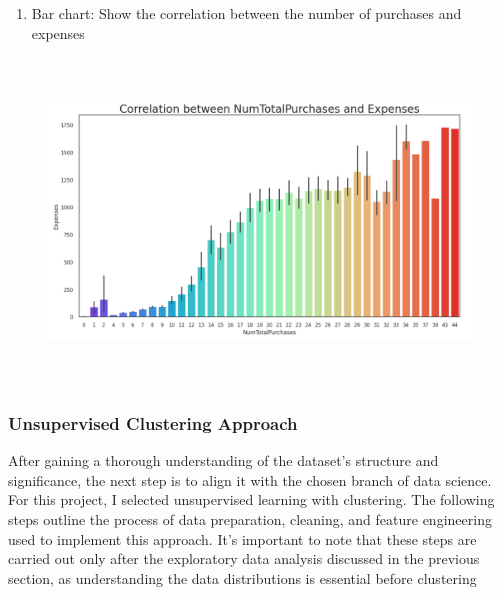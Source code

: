 \documentclass[11pt]{article}
\begin{document}
\begin{enumerate}
	\item Bar chart: Show the correlation between the number of purchases and expenses

\end{enumerate}
\begin{figure}[H]
\centering
\includegraphics[width=15.47cm,height=8.66cm]{./images/image23.png}
\end{figure}


\vspace{1\baselineskip}
\subsubsection{Unsupervised Clustering Approach}

After gaining a thorough understanding of the dataset's structure and significance, the next step is to align it with the chosen branch of data science. For this project, I selected unsupervised learning with clustering. The following steps outline the process of data preparation, cleaning, and feature engineering used to implement this approach. It's important to note that these steps are carried out only after the exploratory data analysis discussed in the previous section, as understanding the data distributions is essential before clustering
\end{document}
